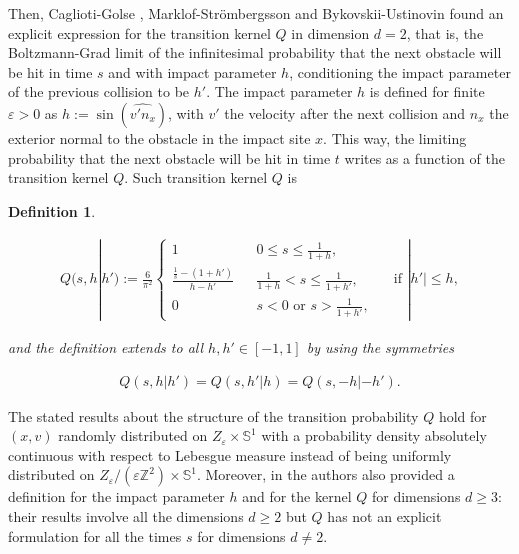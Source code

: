 \documentclass[a4paper,10pt,reqno]{amsart}
\newtheorem{definition}{Definition}[section]
\numberwithin{equation}{subsection}
\numberwithin{figure}{subsection}
\begin{document}
Then, Caglioti-Golse \cite{CG2008,CG2010}, Marklof-Str\"ombergsson \cite{MS2008d2} and Bykovskii-Ustinovin \cite{BU2009} found an explicit expression for the transition kernel $Q$ in dimension $d=2$, that is, the Boltzmann-Grad limit of the infinitesimal probability that the next obstacle will be hit in time $s$ and with impact parameter $h$, conditioning the impact parameter of the previous collision to be $h'$. The impact parameter $h$ is defined for finite $\varepsilon>0$ as $h:=\sin(\widehat{v' n_x})$, with $v'$ the velocity after the next collision and $n_x$ the exterior normal to the obstacle in the impact site $x$. This way, the limiting probability that the next obstacle will be hit in time $t$ writes as a function of the transition kernel $Q$. Such transition kernel $Q$ is
\begin{definition}\label{defQ}

\begin{align*}
 Q(s,h|h'):=\frac{6}{\pi^2}\left\{\begin{array}{lcr}1&&0\leq s\leq \frac{1}{1+h},\\\frac{\frac{1}{s}-(1+h')}{h-h'}&&\frac{1}{1+h}<s\leq\frac{1}{1+h'},\\0&&s<0\textrm{ or }s>\frac{1}{1+h'},\end{array}\right.\quad\textrm{ if }|h'|\leq h,
\end{align*}

and the definition extends to all $h,h'\in[-1,1]$ by using the symmetries

 \begin{align*}
 Q(s,h|h')= Q(s,h'|h)= Q(s,-h|-h').
\end{align*}

\end{definition}
The stated results about the structure of the transition probability $Q$ hold for $(x,v)$ randomly distributed on $Z_{\varepsilon}\times\mathbb{S}^1$ with a probability density absolutely continuous with respect to Lebesgue measure instead of being uniformly distributed on $Z_{\varepsilon}/(\varepsilon\mathbb{Z}^2)\times\mathbb{S}^1$. Moreover, in \cite{MS2010fpl} the authors also provided a definition for the impact parameter $h$ and for the kernel $Q$ for dimensions $d\geq3$: their results involve all the dimensions $d\geq2$ but $Q$ has not an explicit formulation for all the times $s$ for dimensions $d\neq2$.
\newline
\end{document}
